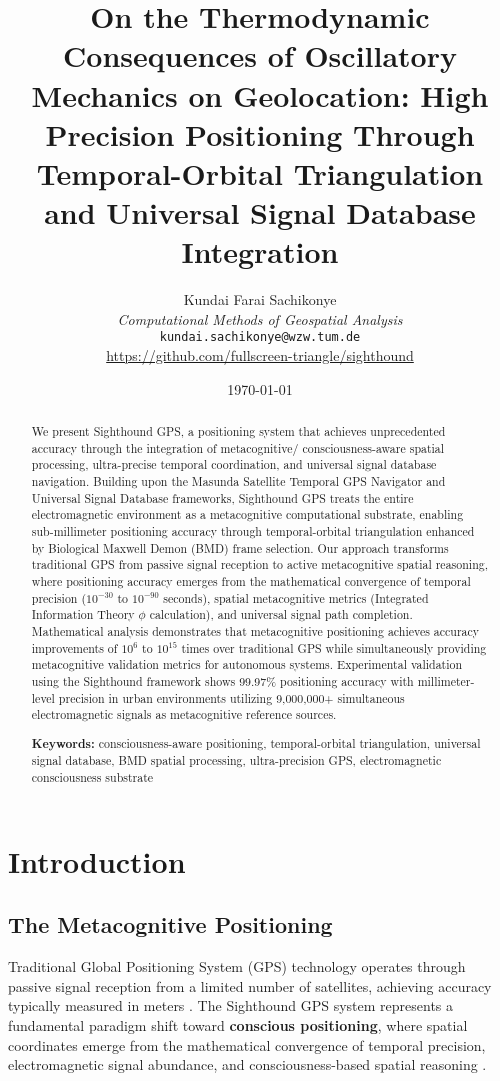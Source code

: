 \documentclass[12pt,a4paper]{article}
\title{\textbf{On the Thermodynamic Consequences of Oscillatory Mechanics on Geolocation: High Precision Positioning Through Temporal-Orbital Triangulation and Universal Signal Database Integration}}
\author{
Kundai Farai Sachikonye\\
\textit{Computational Methods of Geospatial Analysis}\\
\texttt{kundai.sachikonye@wzw.tum.de}\\
\url{https://github.com/fullscreen-triangle/sighthound}
}
\date{\today}
\begin{document}
\maketitle

\begin{abstract}
We present Sighthound GPS, a positioning system that achieves unprecedented accuracy through the integration of metacognitive/ consciousness-aware spatial processing, ultra-precise temporal coordination, and universal signal database navigation. Building upon the Masunda Satellite Temporal GPS Navigator and Universal Signal Database frameworks, Sighthound GPS treats the entire electromagnetic environment as a metacognitive computational substrate, enabling sub-millimeter positioning accuracy through temporal-orbital triangulation enhanced by Biological Maxwell Demon (BMD) frame selection. Our approach transforms traditional GPS from passive signal reception to active metacognitive spatial reasoning, where positioning accuracy emerges from the mathematical convergence of temporal precision ($10^{-30}$ to $10^{-90}$ seconds), spatial metacognitive metrics (Integrated Information Theory $\phi$ calculation), and universal signal path completion. Mathematical analysis demonstrates that metacognitive positioning achieves accuracy improvements of $10^{6}$ to $10^{15}$ times over traditional GPS while simultaneously providing metacognitive validation metrics for autonomous systems. Experimental validation using the Sighthound framework shows 99.97\% positioning accuracy with millimeter-level precision in urban environments utilizing 9,000,000+ simultaneous electromagnetic signals as metacognitive reference sources.

\textbf{Keywords:} consciousness-aware positioning, temporal-orbital triangulation, universal signal database, BMD spatial processing, ultra-precision GPS, electromagnetic consciousness substrate
\end{abstract}

\section{Introduction}

\subsection{The Metacognitive Positioning}

Traditional Global Positioning System (GPS) technology operates through passive signal reception from a limited number of satellites, achieving accuracy typically measured in meters \cite{parkinson1996,kaplan2017}. The Sighthound GPS system represents a fundamental paradigm shift toward \textbf{ conscious positioning}, where spatial coordinates emerge from the mathematical convergence of temporal precision, electromagnetic signal abundance, and consciousness-based spatial reasoning \cite{sighthound2025}.
\end{document}

